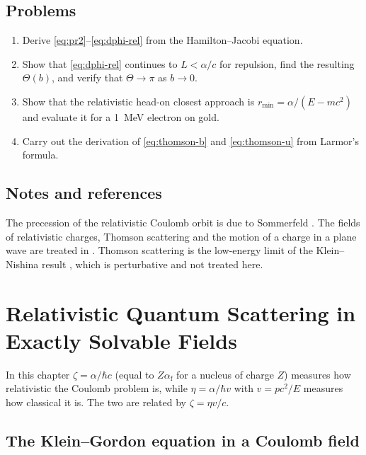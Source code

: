 \documentclass[11pt,a4paper]{book}
\numberwithin{equation}{chapter}
\newcommand{\afs}{\alpha_{\mathrm{f}}}
\begin{document}
\section{Problems}
\begin{enumerate}
  \item Derive \eqref{eq:pr2}--\eqref{eq:dphi-rel} from the Hamilton--Jacobi
        equation.
  \item Show that \eqref{eq:dphi-rel} continues to $L<\alpha/c$ for repulsion,
        find the resulting $\Theta(b)$, and verify that $\Theta\to\pi$ as
        $b\to0$.
  \item Show that the relativistic head-on closest approach is
        $r_{\min}=\alpha/(E-mc^2)$ and evaluate it for a 1~MeV electron on
        gold.
  \item Carry out the derivation of \eqref{eq:thomson-b} and
        \eqref{eq:thomson-u} from Larmor's formula.
\end{enumerate}

\section*{Notes and references}
The precession of the relativistic Coulomb orbit is due to Sommerfeld \cite{Sommerfeld16}. The fields of relativistic charges, Thomson scattering and the motion of a charge in a plane wave are treated in \cite{Jackson,LL2}. Thomson scattering is the low-energy limit of the Klein--Nishina result \cite{KN29}, which is perturbative and not treated here.

\chapter[Relativistic Quantum Scattering]{Relativistic Quantum Scattering in Exactly Solvable Fields}

In this chapter $\zeta=\alpha/\hbar c$ (equal to $Z\afs$ for a nucleus of charge
$Z$) measures how relativistic the Coulomb problem is, while
$\eta=\alpha/\hbar v$ with $v=pc^2/E$ measures how classical it is. The two are
related by $\zeta=\eta v/c$.

\section{The Klein--Gordon equation in a Coulomb field}
\end{document}
